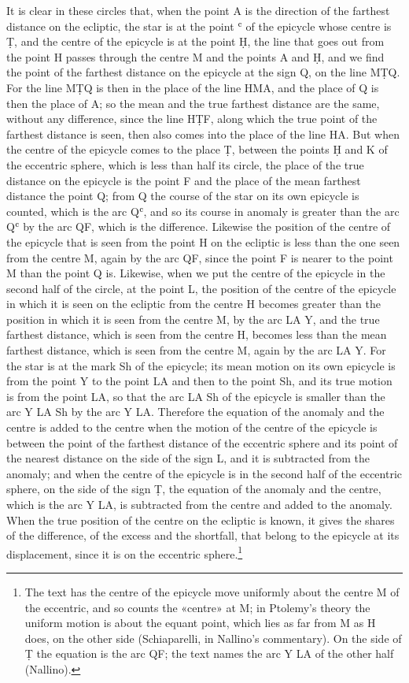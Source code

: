 \documentclass[11pt]{article}
\newcommand{\ArPage}[1]{\marginpar{\footnotesize\color{gray}Ar.\,p.\,#1}}
\begin{document}
\par \ArPage{97}It is clear in these circles that, when the point A is the direction of the farthest distance on the ecliptic, the star is at the point ʿ of the epicycle whose centre is Ṭ, and the centre of the epicycle is at the point Ḥ, the line that goes out from the point H passes through the centre M and the points A and Ḥ, and we find the point of the farthest distance on the epicycle at the sign Q, on the line MṬQ. For the line MṬQ is then in the place of the line HMA, and the place of Q is then the place of A; so the mean and the true farthest distance are the same, without any difference, since the line HṬF, along which the true point of the farthest distance is seen, then also comes into the place of the line HA. But when the centre of the epicycle comes to the place Ṭ, between the points Ḥ and K of the eccentric sphere, which is less than half its circle, the place of the true distance on the epicycle is the point F and the place of the mean farthest distance the point Q; from Q the course of the star on its own epicycle is counted, which is the arc Qʿ, and so its course in anomaly is greater than the arc Qʿ by the arc QF, which is the difference. Likewise the position of the centre of the epicycle that is seen from the point H on the ecliptic is less than the one seen from the centre M, again by the arc QF, since the point F is nearer to the point M than the point Q is. Likewise, when we put the centre of the epicycle in the second half of the circle, at the point L, the position of the centre of the epicycle in which it is seen on the ecliptic from the centre H becomes greater than the position in which it is seen from the centre M, by the arc LA Y, and the true farthest distance, which is seen from the centre H, becomes less than the mean farthest distance, which is seen from the centre M, again by the arc LA Y. For the star is at the mark Sh of the epicycle; its mean motion on its own epicycle is from the point Y to the point LA and then to the point Sh, and its true motion is from the point LA, so that the arc LA Sh of the epicycle is smaller than the arc Y LA Sh by the arc Y LA. Therefore the equation of the anomaly and the centre is added to the centre when the motion of the centre of the epicycle is between the point of the farthest distance of the eccentric sphere and its point of the nearest distance on the side of the sign L, and it is subtracted from the anomaly; and when the centre of the epicycle is in the second half of the eccentric sphere, on the side of the sign Ṭ, the equation of the anomaly and the centre, which is the arc Y LA, is subtracted from the centre and added to the anomaly. When the true position of the centre on the ecliptic is known, it gives the shares of the difference, of the excess and the shortfall, that belong to the epicycle at its displacement, since it is on the eccentric sphere.\footnote{The text has the centre of the epicycle move uniformly about the centre M of the eccentric, and so counts the «centre» at M; in Ptolemy's theory the uniform motion is about the equant point, which lies as far from M as H does, on the other side (Schiaparelli, in Nallino's commentary). On the side of Ṭ the equation is the arc QF; the text names the arc Y LA of the other half (Nallino).}\par
\end{document}
